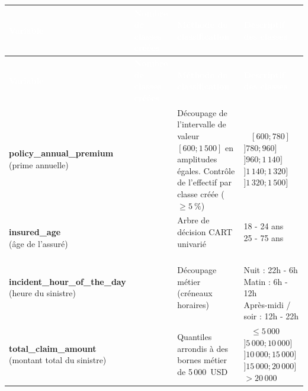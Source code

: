 \begin{footnotesize}
\setlength{\parskip}{0pt}
\renewcommand{\arraystretch}{1.4}
\begin{longtable}{|>{\centering\arraybackslash}m{5.1cm}|>{\centering\arraybackslash}m{2.1cm}|>{\centering\arraybackslash}m{5.0cm}|>{\centering\arraybackslash}m{4.3cm}|}
    \hline
    \rowcolor{accenture}
    \textcolor{white}{\textbf{Variable}} & \textcolor{white}{\textbf{Nombre de classes créées}} & \textcolor{white}{\textbf{Méthode de classification}} & \textcolor{white}{\textbf{Descriptif des classes}} \\
    \hline
    \endfirsthead
    \hline
    \rowcolor{accenture}
    \textcolor{white}{\textbf{Variable}} & \textcolor{white}{\textbf{Nombre de classes créées}} & \textcolor{white}{\textbf{Méthode de classification}} & \textcolor{white}{\textbf{Descriptif des classes}} \\
    \hline
    \endhead
    \hline
    \endfoot
    \endlastfoot
    \shortstack{\textbf{policy\_annual\_premium} \\ (prime annuelle)} & 5 & Découpage de l'intervalle de valeur $[600 ; 1\,500]$ en amplitudes égales. Contrôle de l'effectif par classe créée ($\geq 5~\%$) & \shortstack{~ \\ $[600 ; 780]$ \\ $]780 ; 960]$ \\ $]960 ; 1\,140]$ \\ $]1\,140 ; 1\,320]$ \\ $]1\,320 ; 1\,500]$} \\
    \hline
    \shortstack{~ \\ \textbf{insured\_age} \\ (âge de l'assuré)} & 2 & Arbre de décision CART univarié & \shortstack{18 - 24 ans \\ 25 - 75 ans} \\
    \hline
    \shortstack{\textbf{incident\_hour\_of\_the\_day} \\ (heure du sinistre)} & 3 & Découpage métier (créneaux horaires) & \shortstack{~ \\ Nuit : 22h - 6h \\ Matin : 6h - 12h \\ Après-midi / soir : 12h - 22h} \\
    \hline
    \shortstack{\textbf{total\_claim\_amount} \\ (montant total du sinistre)} & 5 & Quantiles arrondis à des bornes métier de 5\,000~USD & \shortstack{~ \\ $\leq 5\,000$ \\ $]5\,000 ; 10\,000]$ \\ $]10\,000 ; 15\,000]$ \\ $]15\,000 ; 20\,000]$ \\ $> 20\,000$} \\

\end{longtable}
\end{footnotesize}
